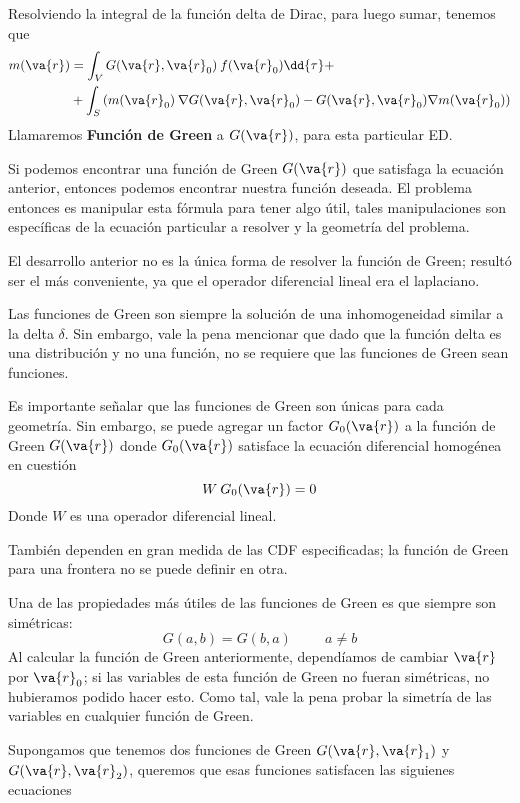 Resolviendo la integral de la función delta de Dirac, para luego sumar, tenemos que
\begin{align}
m(\va{r}) &= \int_{V} G(\va{r}, \va{r}_{0}) \: f(\va{r}_{0}) \dd{\tau} + \label{eq:ecuacion_10} \\
&+ \int_{S} \left( m(\va{r}_{0}) \: \nabla G(\va{r}, \va{r}_{0}) - G(\va{r}, \va{r}_{0}) \nabla m(\va{r}_{0}) \right) \label{eq:ecuacion_11}
\end{align}
Llamaremos \textbf{Función de Green} a $G(\va{r})$, para esta particular ED.
\par
Si podemos encontrar una función de Green  $G(\va{r})$ que satisfaga la ecuación anterior, entonces podemos encontrar nuestra función deseada. El problema entonces es manipular esta fórmula para tener algo útil, tales manipulaciones son específicas de la ecuación particular a resolver y la geometría del problema.
\par
El desarrollo anterior no es la única forma de resolver la función de Green; resultó ser el más conveniente, ya que el operador diferencial lineal era el laplaciano.
\par
Las funciones de Green son siempre la solución de una inhomogeneidad similar a la delta $\delta$. Sin embargo, vale la pena mencionar que dado que la función delta es una distribución y no una función, no se requiere que las funciones de Green sean funciones.
\par
Es importante señalar que las funciones de Green son únicas para cada geometría. Sin embargo, se puede agregar un factor $G_{0} (\va{r})$ a la función de Green $G(\va{r})$ donde $G_{0} (\va{r})$ satisface la ecuación diferencial homogénea en cuestión
\begin{equation}
W \: G_{0} (\va{r}) = 0
\label{eq:ecuacion_12}
\end{equation}
Donde $W$ es una operador diferencial lineal.
\par
También dependen en gran medida de las CDF especificadas; la función de Green para una frontera  no se puede definir en otra. 
\par
Una de las propiedades más útiles de las funciones de Green es que siempre son simétricas:
\begin{equation}
G(a, b) =  G(b, a) \hspace{1cm} a \neq b
\label{eq:ecuacione_13}
\end{equation}
Al calcular la función de Green anteriormente, dependíamos de cambiar $\va{r}$ por $\va{r}_{0}$; si las variables de esta función de Green no fueran simétricas, no hubieramos podido hacer esto. Como tal, vale la pena probar la simetría de las variables en cualquier función de Green.
\par
Supongamos que tenemos dos funciones de Green $G(\va{r}, \va{r}_{1})$ y $G(\va{r}, \va{r}_{2})$, queremos que esas funciones satisfacen las siguienes ecuaciones
